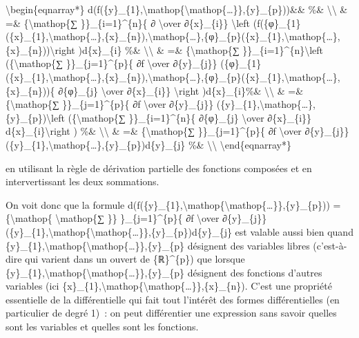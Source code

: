 \documentclass[]{article}
\begin{document}
\textbackslash{}begin\{eqnarray*\}
d(f(\{y\}\_\{1\},\textbackslash{}mathop\{\textbackslash{}mathop\{\ldots{}\}\},\{y\}\_\{p\}))\&\&
\%\& \textbackslash{}\textbackslash{} \& =\& \{\textbackslash{}mathop\{∑
\}\}\_\{i=1\}\^{}\{n\}\{ ∂ \textbackslash{}over ∂\{x\}\_\{i\}\}
\textbackslash{}left
(f(\{φ\}\_\{1\}(\{x\}\_\{1\},\textbackslash{}mathop\{\ldots{}\},\{x\}\_\{n\}),\textbackslash{}mathop\{\ldots{}\},\{φ\}\_\{p\}(\{x\}\_\{1\},\textbackslash{}mathop\{\ldots{}\},\{x\}\_\{n\}))\textbackslash{}right
)d\{x\}\_\{i\} \%\& \textbackslash{}\textbackslash{} \& =\&
\{\textbackslash{}mathop\{∑ \}\}\_\{i=1\}\^{}\{n\}\textbackslash{}left
(\{\textbackslash{}mathop\{∑ \}\}\_\{j=1\}\^{}\{p\}\{ ∂f
\textbackslash{}over ∂\{y\}\_\{j\}\}
(\{φ\}\_\{1\}(\{x\}\_\{1\},\textbackslash{}mathop\{\ldots{}\},\{x\}\_\{n\}),\textbackslash{}mathop\{\ldots{}\},\{φ\}\_\{p\}(\{x\}\_\{1\},\textbackslash{}mathop\{\ldots{}\},\{x\}\_\{n\}))\{
∂\{φ\}\_\{j\} \textbackslash{}over ∂\{x\}\_\{i\}\} \textbackslash{}right
)d\{x\}\_\{i\}\%\& \textbackslash{}\textbackslash{} \& =\&
\{\textbackslash{}mathop\{∑ \}\}\_\{j=1\}\^{}\{p\}\{ ∂f
\textbackslash{}over ∂\{y\}\_\{j\}\}
(\{y\}\_\{1\},\textbackslash{}mathop\{\ldots{}\},\{y\}\_\{p\})\textbackslash{}left
(\{\textbackslash{}mathop\{∑ \}\}\_\{i=1\}\^{}\{n\}\{ ∂\{φ\}\_\{j\}
\textbackslash{}over ∂\{x\}\_\{i\}\} d\{x\}\_\{i\}\textbackslash{}right
) \%\& \textbackslash{}\textbackslash{} \& =\&
\{\textbackslash{}mathop\{∑ \}\}\_\{j=1\}\^{}\{p\}\{ ∂f
\textbackslash{}over ∂\{y\}\_\{j\}\}
(\{y\}\_\{1\},\textbackslash{}mathop\{\ldots{}\},\{y\}\_\{p\})d\{y\}\_\{j\}
\%\& \textbackslash{}\textbackslash{} \textbackslash{}end\{eqnarray*\}

en utilisant la règle de dérivation partielle des fonctions composées et
en intervertissant les deux sommations.

On voit donc que la formule
d(f(\{y\}\_\{1\},\textbackslash{}mathop\{\textbackslash{}mathop\{\ldots{}\}\},\{y\}\_\{p\}))
=\{\textbackslash{}mathop\{ \textbackslash{}mathop\{∑ \}\}
\}\_\{j=1\}\^{}\{p\}\{ ∂f \textbackslash{}over ∂\{y\}\_\{j\}\}
(\{y\}\_\{1\},\textbackslash{}mathop\{\textbackslash{}mathop\{\ldots{}\}\},\{y\}\_\{p\})d\{y\}\_\{j\}
est valable aussi bien quand
\{y\}\_\{1\},\textbackslash{}mathop\{\textbackslash{}mathop\{\ldots{}\}\},\{y\}\_\{p\}
désignent des variables libres (c'est-à-dire qui varient dans un ouvert
de \{ℝ\}\^{}\{p\}) que lorsque
\{y\}\_\{1\},\textbackslash{}mathop\{\textbackslash{}mathop\{\ldots{}\}\},\{y\}\_\{p\}
désignent des fonctions d'autres variables (ici
\{x\}\_\{1\},\textbackslash{}mathop\{\textbackslash{}mathop\{\ldots{}\}\},\{x\}\_\{n\}).
C'est une propriété essentielle de la différentielle qui fait tout
l'intérêt des formes différentielles (en particulier de degré 1)~: on
peut différentier une expression sans savoir quelles sont les variables
et quelles sont les fonctions.
\end{document}
